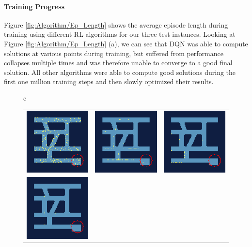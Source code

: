 \paragraph{Training Progress}
Figure \ref{fig:Algorithm/Ep_Length} shows the average episode length during training using different RL algorithms for our three test instances. Looking at Figure \ref{fig:Algorithm/Ep_Length} (a), we can see that DQN was able to compute solutions at various points during training, but suffered from performance collapses multiple times and was therefore unable to converge to a good final solution. All other algorithms were able to compute good solutions during the first one million training steps and then slowly optimized their results. 

\begin{figure} [htp]
    \begin{center}
        \begin{tabular}{c}
            \begin{tabular}{ccc}
                \includegraphics[width=0.25\columnwidth]{figures/evaluation/algorithms/training_example/acktr/0_k.png} & 
                \includegraphics[width=0.25\columnwidth]{figures/evaluation/algorithms/training_example/acktr/6_k.png} & 
                \includegraphics[width=0.25\columnwidth]{figures/evaluation/algorithms/training_example/acktr/12_k.png} \\
                \addlinespace[0.2cm]
                \includegraphics[width=0.25\columnwidth]{figures/evaluation/algorithms/training_example/acktr/18_k.png} &

\end{tabular}
\end{tabular}
\end{center}
\end{figure}
